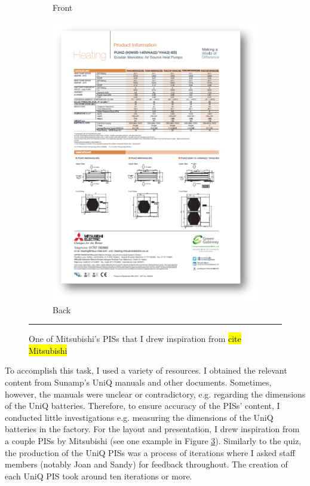 \begin{figure}
\begin{subfigure}{.19\textwidth}
		\caption{Front}
		\label{mitsubishi01}
	\end{subfigure}
	\begin{subfigure}{.19\textwidth}
		\centering
		\includegraphics[width=\textwidth]{figures/Mitsubishi02.png}
		\caption{Back}
		\label{mitsubishi02}
	\end{subfigure}
	\rule{0.4\textwidth}{0.5pt} %
	\caption[Mitsubishi's PISs.]{One of Mitsubishi's PISs that I drew inspiration from \hl{cite Mitsubishi}
	}
	\label{mitsubishi}
\end{figure}

To accomplish this task, I used a variety of resources.
I obtained the relevant content from Sunamp's UniQ manuals and other documents.
Sometimes, however, the manuals were unclear or contradictory, e.g. regarding the dimensions of the UniQ batteries.
Therefore, to ensure accuracy of the PISs' content, I conducted little investigations e.g. measuring the dimensions of the UniQ batteries in the factory.
For the layout and presentation, I drew inspiration from a couple PISs by Mitsubishi (see one example in Figure \ref{mitsubishi}).
Similarly to the quiz, the production of the UniQ PISs was a process of iterations where I asked staff members (notably Joan and Sandy) for feedback throughout.
The creation of each UniQ PIS took around ten iterations or more.


